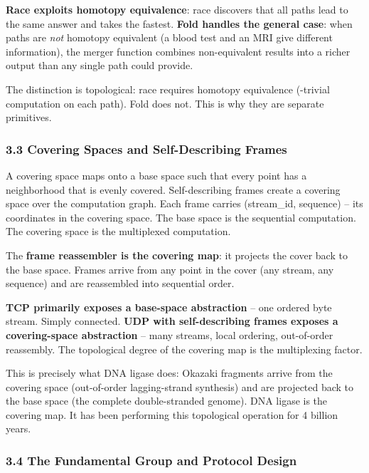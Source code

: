 \documentclass[
]{article}
\begin{document}
\textbf{Race exploits homotopy equivalence}: race discovers that all
paths lead to the same answer and takes the fastest. \textbf{Fold
handles the general case}: when paths are \emph{not} homotopy equivalent
(a blood test and an MRI give different information), the merger
function combines non-equivalent results into a richer output than any
single path could provide.

The distinction is topological: race requires homotopy equivalence
(-trivial computation on each path). Fold does not. This is why they are
separate primitives.

\subsubsection{\texorpdfstring{\textbf{3.3 Covering Spaces and
Self-Describing
Frames}}{3.3 Covering Spaces and Self-Describing Frames}}\label{covering-spaces-and-self-describing-frames}

A covering space maps onto a base space such that every point has a
neighborhood that is evenly covered. Self-describing frames create a
covering space over the computation graph. Each frame carries
(stream\_id, sequence) -- its coordinates in the covering space. The
base space is the sequential computation. The covering space is the
multiplexed computation.

The \textbf{frame reassembler is the covering map}: it projects the
cover back to the base space. Frames arrive from any point in the cover
(any stream, any sequence) and are reassembled into sequential order.

\textbf{TCP primarily exposes a base-space abstraction} -- one ordered
byte stream. Simply connected. \textbf{UDP with self-describing frames
exposes a covering-space abstraction} -- many streams, local ordering,
out-of-order reassembly. The topological degree of the covering map is
the multiplexing factor.

This is precisely what DNA ligase does: Okazaki fragments arrive from
the covering space (out-of-order lagging-strand synthesis) and are
projected back to the base space (the complete double-stranded genome).
DNA ligase is the covering map. It has been performing this topological
operation for 4 billion years.

\subsubsection{\texorpdfstring{\textbf{3.4 The Fundamental Group and
Protocol
Design}}{3.4 The Fundamental Group and Protocol Design}}\label{the-fundamental-group-and-protocol-design}
\end{document}
